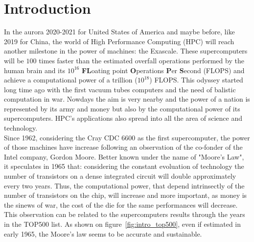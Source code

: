 \chapter*{Introduction}

In the aurora 2020-2021 for United States of America and maybe before, like 2019 for China, the world of High Performance Computing (HPC) will reach another milestone in the power of machines: the Exascale. 
These supercomputers will be $100$ times faster than the estimated overfall operations performed by the human brain and its $10^{16}$ \textbf{FL}oating point \textbf{O}perations \textbf{P}er \textbf{S}econd (FLOPS) and achieve a computational power of a trillion ($10^{18}$) FLOPS.
This odyssey started long time ago with the first vacuum tubes computers and the need of balistic computation in war. 
Nowdays the aim is very nearby and the power of a nation is represented by its army and money but also by the computational power of its supercomputers.
HPC's applications also spread into all the area of science and technology.\\

Since 1962, considering the Cray CDC 6600 as the first supercomputer, the power of those machines have increase following an observation of the co-fonder of the Intel company, Gordon Moore. 
Better known under the name of "Moore's Law", it speculates in 1965 that: considering the constant evoluation of technology the number of transistors on a dense integrated circuit will double approximately every two years. 
Thus, the computational power, that depend intrinsectly of the number of transistors on the chip, will increase and more important, as money is the sinews of war, the cost of the die for the same performances will decrease.  
This observation can be related to the supercomputers results through the years in the TOP500 list. 
As shown on figure~\ref{fig:intro_top500}, even if estimated in early 1965, the Moore's law seems to be accurate and sustainable. 

